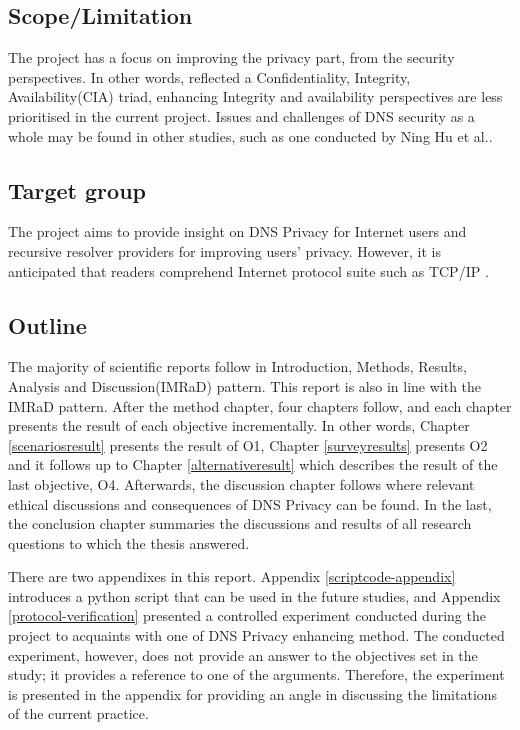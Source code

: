 \documentclass[a4paper,12pt]{article}
\begin{document}
\subsection{Scope/Limitation}
The project has a focus on improving the privacy part, from the security perspectives. In other words, reflected a Confidentiality, Integrity, Availability(CIA) triad, enhancing Integrity and availability perspectives are less prioritised in the current project. Issues and challenges of DNS security as a whole may be found in other studies, such as one conducted by Ning Hu et al.\cite{ning2017dnssecurity}. 

\subsection{Target group}
The project aims to provide insight on DNS Privacy for Internet users and recursive resolver providers for improving users' privacy.
However, it is anticipated that readers comprehend Internet protocol suite such as TCP/IP \cite{rfc1122}.

\subsection{Outline}
The majority of scientific reports follow in Introduction, Methods, Results, Analysis and Discussion(IMRaD) pattern.
This report is also in line with the IMRaD pattern. After the method chapter, four chapters follow, and each chapter presents the result of each objective incrementally. In other words, Chapter \ref{scenariosresult} presents the result of O1, Chapter \ref{surveyresults} presents O2 and it follows up to Chapter \ref{alternativeresult} which describes the result of the last objective, O4.
Afterwards, the discussion chapter follows where relevant ethical discussions and consequences of DNS Privacy can be found. In the last, the conclusion chapter summaries the discussions and results of all research questions to which the thesis answered.

There are two appendixes in this report.
Appendix \ref{scriptcode-appendix} introduces a python script that can be used in the future studies, and Appendix \ref{protocol-verification} presented a controlled experiment conducted during the project to acquaints with one of DNS Privacy enhancing method.
The conducted experiment, however, does not provide an answer to the objectives set in the study; it provides a reference to one of the arguments.
Therefore, the experiment is presented in the appendix for providing an angle in discussing the limitations of the current practice.
\end{document}

